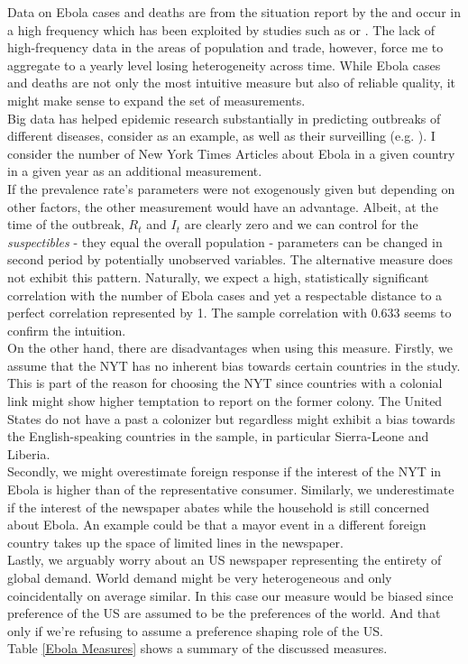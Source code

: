 \documentclass{article}
\begin{document}
Data on Ebola cases and deaths are from the situation report by the \cite{whoebola} and occur in a high frequency which has been exploited by studies such as \cite{gonzalez2017epidemics} or \cite{althaus2014estimating}. The lack of high-frequency data in the areas of population and trade, however, force me to aggregate to a yearly level losing heterogeneity across time. While Ebola cases and deaths are not only the most intuitive measure but also of reliable quality, it might make sense to expand the set of measurements.\\
Big data has helped epidemic research substantially in predicting outbreaks of different diseases, consider \cite{ginsberg2009detecting} as an example, as well as their surveilling (e.g. \cite{chan2011using}).
I consider the number of New York Times Articles about Ebola in a given country in a given year as an additional measurement. \\
If the prevalence rate's parameters were not exogenously given but depending on other factors, the other measurement would have an advantage. Albeit, at the time of the outbreak, $R_t$ and $I_t$ are clearly zero and we can control for the \textit{suspectibles} - they equal the overall population - parameters can be changed in second period by potentially unobserved variables. The alternative measure does not exhibit this pattern. Naturally, we expect a high, statistically significant correlation with the number of Ebola cases and yet a respectable distance to a perfect correlation represented by 1. The sample correlation with 0.633 seems to confirm the intuition. \\
On the other hand, there are disadvantages when using this measure.
Firstly, we assume that the NYT has no inherent bias towards certain countries in the study. This is part of the reason for choosing the NYT since countries with a colonial link might show higher temptation to report on the former colony. The United States do not have a past a colonizer but regardless might exhibit a bias towards the English-speaking countries in the sample, in particular Sierra-Leone and Liberia. \\
Secondly, we might overestimate foreign response if the interest of the NYT in Ebola is higher than of the representative consumer. Similarly, we underestimate if the interest of the newspaper abates while the household is still concerned about Ebola. An example could be that a mayor event in a different foreign country takes up the space of limited lines in the newspaper.\\
Lastly, we arguably worry about an US newspaper representing the entirety of global demand. World demand might be very heterogeneous and only coincidentally on average similar. In this case our measure would be biased since preference of the US are assumed to be the preferences of the world. And that only if we're refusing to assume a preference shaping role of the US. \\
Table \ref{Ebola Measures} shows a summary of the discussed measures.
\end{document}
